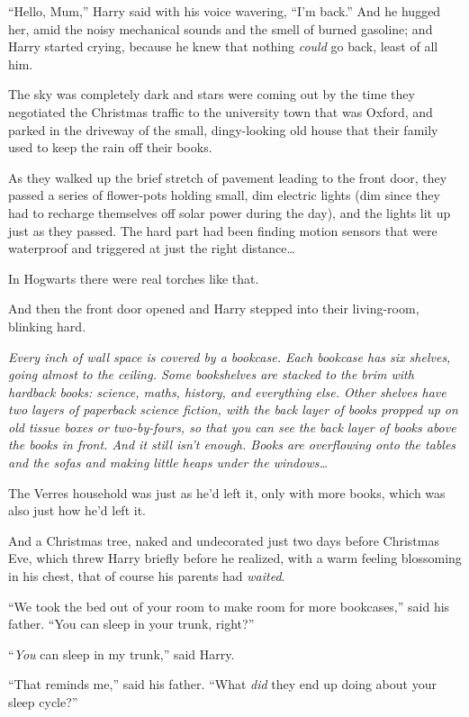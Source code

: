 “Hello, Mum,” Harry said with his voice wavering,
“I’m back.” And he hugged her, amid the noisy mechanical sounds and the smell of burned gasoline; and Harry started crying, because he knew that nothing \emph{could} go back, least of all him.

\later

The sky was completely dark and stars were coming out by the time they negotiated the Christmas traffic to the university town that was Oxford, and parked in the driveway of the small, dingy-looking old house that their family used to keep the rain off their books.

As they walked up the brief stretch of pavement leading to the front door, they passed a series of flower-pots holding small, dim electric lights (dim since they had to recharge themselves off solar power during the day), and the lights lit up just as they passed. The hard part had been finding motion sensors that were waterproof and triggered at just the right distance…

In Hogwarts there were real torches like that.

And then the front door opened and Harry stepped into their living-room, blinking hard.

\emph{Every inch of wall space is covered by a bookcase. Each bookcase has six shelves, going almost to the ceiling. Some bookshelves are stacked to the brim with hardback books: science, maths, history, and everything else. Other shelves have two layers of paperback science fiction, with the back layer of books propped up on old tissue boxes or two-by-fours, so that you can see the back layer of books above the books in front. And it still isn’t enough. Books are overflowing onto the tables and the sofas and making little heaps under the windows…}

The Verres household was just as he’d left it, only with more books, which was also just how he’d left it.

And a Christmas tree, naked and undecorated just two days before Christmas Eve, which threw Harry briefly before he realized, with a warm feeling blossoming in his chest, that of course his parents had \emph{waited}.

“We took the bed out of your room to make room for more bookcases,” said his father.
“You can sleep in your trunk, right?”

“\emph{You} can sleep in my trunk,” said Harry.

“That reminds me,” said his father.
“What \emph{did} they end up doing about your sleep cycle?”

